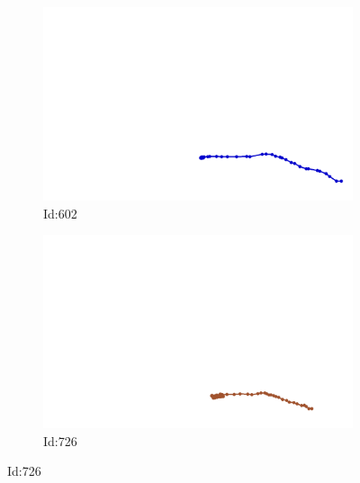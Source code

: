 \documentclass[12pt,twoside]{report}
\begin{document}
\begin{figure}
\centering
\begin{subfigure}[b]{0.20\textwidth}
\centering
\includegraphics[width=\textwidth]{../../trajectories/602.png}
\caption{Id:602}
\end{subfigure}
\begin{subfigure}[b]{0.20\textwidth}
\centering
\includegraphics[width=\textwidth]{../../trajectories/726.png}
\caption{Id:726}
\end{subfigure}
\end{figure}
\end{document}
